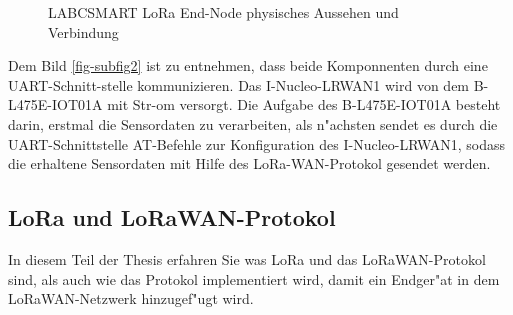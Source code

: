 \begin{figure}[h!]
	\centering
	\caption{LABCSMART LoRa End-Node physisches Aussehen 
	 und Verbindung 
	\label{fig:loranode}}
\end{figure}

Dem Bild \ref{fig-subfig2} ist zu entnehmen, dass beide Komponnenten 
durch eine UART-Schnitt-stelle kommunizieren. Das I-Nucleo-LRWAN1 wird 
von dem  B-L475E-IOT01A mit Str-om versorgt. Die Aufgabe des 
B-L475E-IOT01A besteht darin, erstmal die Sensordaten zu verarbeiten, 
als n"achsten sendet es durch die UART-Schnittstelle AT-Befehle zur 
Konfiguration des I-Nucleo-LRWAN1, sodass die erhaltene Sensordaten mit 
Hilfe des LoRa-WAN-Protokol gesendet werden. 

\subsection{LoRa und LoRaWAN-Protokol}\label{LoRaWAN_P}

In diesem Teil der Thesis erfahren Sie was LoRa und das 
LoRaWAN-Protokol sind, als auch wie das Protokol implementiert wird, 
damit ein Endger"at in dem LoRaWAN-Netzwerk hinzugef"ugt wird.

